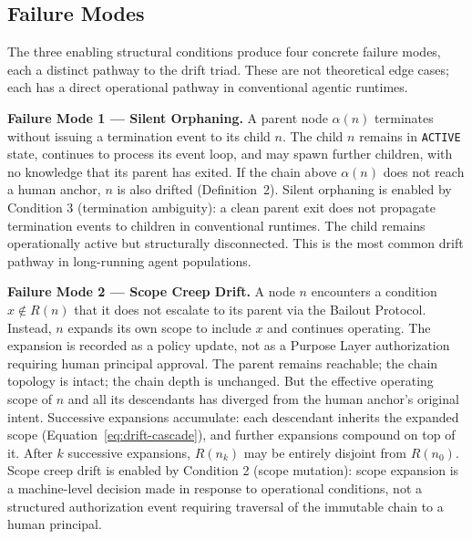 \documentclass[12pt]{article}
\begin{document}
\subsection{Failure Modes}
\label{sec:drift-failure-modes}

The three enabling structural conditions produce four concrete failure modes, each a distinct pathway to the drift triad. These are not theoretical edge cases; each has a direct operational pathway in conventional agentic runtimes.

\medskip
\noindent\textbf{Failure Mode 1 — Silent Orphaning.}
A parent node $\alpha(n)$ terminates without issuing a termination event to its child $n$. The child $n$ remains in \texttt{ACTIVE} state, continues to process its event loop, and may spawn further children, with no knowledge that its parent has exited. If the chain above $\alpha(n)$ does not reach a human anchor, $n$ is also drifted (Definition~2). Silent orphaning is enabled by Condition 3 (termination ambiguity): a clean parent exit does not propagate termination events to children in conventional runtimes. The child remains operationally active but structurally disconnected. This is the most common drift pathway in long-running agent populations.

\medskip
\noindent\textbf{Failure Mode 2 — Scope Creep Drift.}
A node $n$ encounters a condition $x \notin R(n)$ that it does not escalate to its parent via the Bailout Protocol. Instead, $n$ expands its own scope to include $x$ and continues operating. The expansion is recorded as a policy update, not as a Purpose Layer authorization requiring human principal approval. The parent remains reachable; the chain topology is intact; the chain depth is unchanged. But the effective operating scope of $n$ and all its descendants has diverged from the human anchor's original intent. Successive expansions accumulate: each descendant inherits the expanded scope (Equation~\ref{eq:drift-cascade}), and further expansions compound on top of it. After $k$ successive expansions, $R(n_k)$ may be entirely disjoint from $R(n_0)$. Scope creep drift is enabled by Condition 2 (scope mutation): scope expansion is a machine-level decision made in response to operational conditions, not a structured authorization event requiring traversal of the immutable chain to a human principal.
\end{document}
